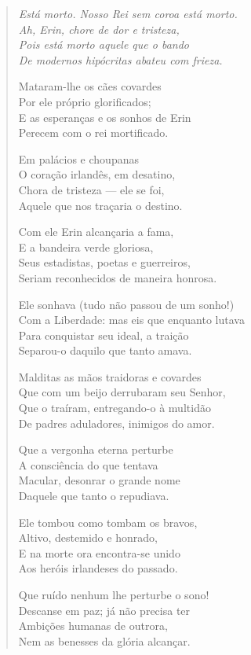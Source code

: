 \begin{verse}\itshape
Está morto.  Nosso Rei sem coroa está morto.\\
Ah, Erin, chore de dor e tristeza,\\
Pois está morto aquele que o bando\\
De modernos hipócritas abateu com frieza.

Mataram-lhe os cães covardes\\
Por ele próprio glorificados;\\
E as esperanças e os sonhos de Erin\\
Perecem com o rei mortificado.

Em palácios e choupanas\\
O coração irlandês, em desatino,\\
Chora de tristeza --- ele se foi,\\
Aquele que nos traçaria o destino.

Com ele Erin alcançaria a fama,\\
E a bandeira verde gloriosa,\\
Seus estadistas, poetas e guerreiros,\\
Seriam reconhecidos de maneira honrosa.

Ele sonhava (tudo não passou de um sonho!)\\
Com a Liberdade: mas eis que enquanto lutava\\
Para conquistar seu ideal, a traição\\
Separou-o daquilo que tanto amava.

Malditas as mãos traidoras e covardes\\
Que com um beijo derrubaram seu Senhor,\\
Que o traíram, entregando-o à multidão\\
De padres aduladores, inimigos do amor.

Que a vergonha eterna perturbe\\
A consciência do que tentava\\
Macular, desonrar o grande nome\\
Daquele que tanto o repudiava.

Ele tombou como tombam os bravos,\\
Altivo, destemido e honrado,\\
E na morte ora encontra-se unido\\
Aos heróis irlandeses do passado.

Que ruído nenhum lhe perturbe o sono!\\
Descanse em paz; já não precisa ter\\
Ambições humanas de outrora,\\
Nem as benesses da glória alcançar.


\end{verse}
